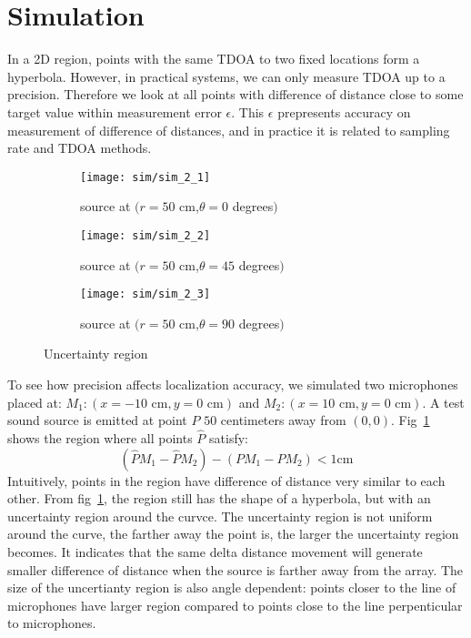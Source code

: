\section{Simulation}
In a 2D region, points with the same TDOA to two fixed locations form a hyperbola. However, in practical systems, we can only measure TDOA up to a precision. Therefore we look at all points with difference of distance close to some target value within measurement error $\epsilon$. This $\epsilon$ prepresents accuracy on measurement of difference of distances, and in practice it is related to sampling rate and TDOA methods.

\begin{figure}[]
  \centering
  \begin{subfigure}[]{.23\textwidth}
    \texttt{[image: sim/sim\_2\_1]}
    \caption{source at $(r=50$ cm,$\theta = 0$ degrees$)$}
  \end{subfigure}
  \begin{subfigure}[]{.23\textwidth}
    \texttt{[image: sim/sim\_2\_2]}
    \caption{source at $(r=50$ cm,$\theta = 45$ degrees$)$}
  \end{subfigure}
  \begin{subfigure}[]{.23\textwidth}
    \texttt{[image: sim/sim\_2\_3]}
    \caption{source at $(r=50$ cm,$\theta = 90$ degrees$)$}
  \end{subfigure}
  \caption{Uncertainty region}
  \label{fig:sim_2_5}
\end{figure}

To see how precision affects localization accuracy, we simulated two microphones placed at: $M_1:(x=-10\mbox{ cm},y=0\mbox{ cm})$ and $M_2:(x=10\mbox{ cm},y=0\mbox{ cm})$. A test sound source is emitted at point $P$ $50$ centimeters away from $(0,0)$. Fig~\ref{fig:sim_2_5} shows the region where all points $\hat P$ satisfy:
\[
 (\hat P M_1 - \hat P M_2) - (P M_1 - P M_2) < 1 \mbox{cm}
\]
Intuitively, points in the region have difference of distance very similar to each other. From fig~\ref{fig:sim_2_5}, the region still has the shape of a hyperbola, but with an uncertainty region around the curvce. The uncertainty region is not uniform around the curve, the farther away the point is, the larger the uncertainty region becomes. It indicates that the same delta distance movement will generate smaller difference of distance when the source is farther away from the array. The size of the uncertianty region is also angle dependent: points closer to the line of microphones have larger region compared to points close to the line perpenticular to microphones. 

